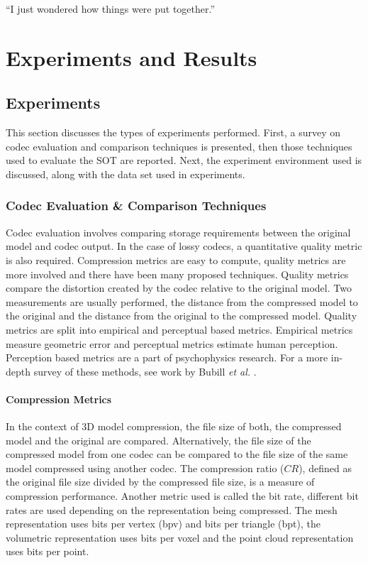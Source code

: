 \begin{savequote}[8cm]
  ``I just wondered how things were put together.''
\end{savequote}
\makeatletter
\chapter{Experiments and Results}

\section{Experiments}

This section discusses the types of experiments performed. First, a survey on codec evaluation and comparison techniques is presented, then those techniques used to evaluate the SOT are reported. Next, the experiment environment used is discussed, along with the data set used in experiments.

\subsection{Codec Evaluation \& Comparison Techniques}

Codec evaluation involves comparing storage requirements between the original model and codec output. In the case of lossy codecs, a quantitative quality metric is also required. Compression metrics are easy to compute, quality metrics are more involved and there have been many proposed techniques. Quality metrics compare the distortion created by the codec relative to the original model. Two measurements are usually performed, the distance from the compressed model to the original and the distance from the original to the compressed model. Quality metrics are split into empirical and perceptual based metrics. Empirical metrics measure geometric error and perceptual metrics estimate human perception. Perception based metrics are a part of psychophysics research. For a more in-depth survey of these methods, see work by Bubill \textit{et al.} \cite{Bulbul11Assessing}.

\subsubsection{Compression Metrics}

In the context of 3D model compression, the file size of both, the compressed model and the original are compared. Alternatively, the file size of the compressed model from one codec can be compared to the file size of the same model compressed using another codec. The compression ratio ($CR$), defined as the original file size divided by the compressed file size, is a measure of compression performance. Another metric used is called the bit rate, different bit rates are used depending on the representation being compressed. The mesh representation uses bits per vertex (bpv) and bits per triangle (bpt), the volumetric representation uses bits per voxel and the point cloud representation uses bits per point.

